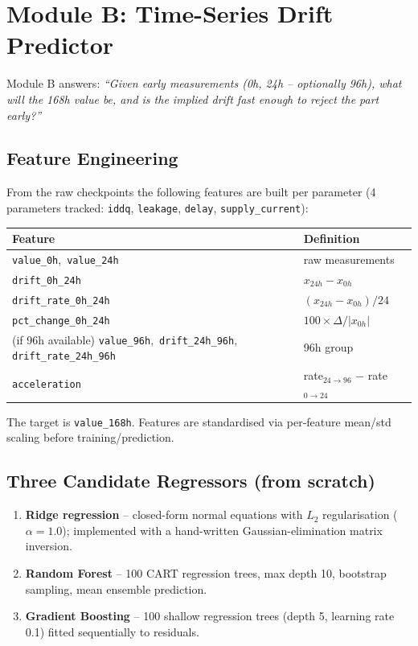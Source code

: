 \documentclass[11pt,a4paper]{article}
\newcommand{\code}[1]{\texttt{\small #1}}
\begin{document}
\section{Module B: Time-Series Drift Predictor}
\label{sec:modB}

Module B answers: \emph{``Given early measurements (0h, 24h -- optionally 96h), what will the
168h value be, and is the implied drift fast enough to reject the part early?''}

\subsection{Feature Engineering}
From the raw checkpoints the following features are built per parameter (4 parameters tracked:
\code{iddq}, \code{leakage}, \code{delay}, \code{supply\_current}):

\begin{center}
\begin{tabular}{ll}
  \toprule
  \textbf{Feature} & \textbf{Definition} \\
  \midrule
  \code{value\_0h},\ \code{value\_24h}            & raw measurements \\
  \code{drift\_0h\_24h}                           & $x_{24h}-x_{0h}$ \\
  \code{drift\_rate\_0h\_24h}                     & $(x_{24h}-x_{0h}) / 24$ \\
  \code{pct\_change\_0h\_24h}                     & $100 \times \Delta / |x_{0h}|$ \\
  (if 96h available)
  \code{value\_96h},\ \code{drift\_24h\_96h},
  \code{drift\_rate\_24h\_96h}                    & 96h group \\
  \code{acceleration}                             & rate$_{24\to96}$ $-$ rate$_{0\to24}$ \\
  \bottomrule
\end{tabular}
\end{center}

The target is \code{value\_168h}. Features are standardised via per-feature
mean/std scaling before training/prediction.

\subsection{Three Candidate Regressors (from scratch)}
\begin{enumerate}[leftmargin=1.5em]
  \item \textbf{Ridge regression} -- closed-form normal equations with $L_2$ regularisation
        ($\alpha=1.0$); implemented with a hand-written Gaussian-elimination matrix inversion.
  \item \textbf{Random Forest} -- 100 CART regression trees, max depth 10, bootstrap
        sampling, mean ensemble prediction.
  \item \textbf{Gradient Boosting} -- 100 shallow regression trees (depth 5, learning rate
        0.1) fitted sequentially to residuals.
\end{enumerate}
\end{document}

